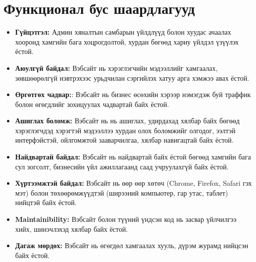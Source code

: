 \section{Функционал бус шаардлагууд}
\begin{itemize}
	\item \textbf{Гүйцэтгэл:} Админ хяналтын самбарын үйлдлүүд болон хуудас ачаалах хооронд хамгийн бага хоцрогдолтой, хурдан бөгөөд хариу үйлдэл үзүүлэх ёстой.

	\item \textbf{Аюулгүй байдал:} Вэбсайт нь хэрэглэгчийн мэдээллийг хамгаалах, зөвшөөрөлгүй нэвтрэхээс урьдчилан сэргийлэх хатуу арга хэмжээ авах ёстой.

	\item \textbf{Өргөтгөх чадвар:}: Вэбсайт нь бизнес өсөхийн хэрээр нэмэгдэж буй траффик болон өгөгдлийг зохицуулах чадвартай байх ёстой.

	\item \textbf{Ашиглах боломж:} Вэбсайт нь  нь ашиглах, удирдахад хялбар байх бөгөөд хэрэглэгчдэд хэрэгтэй мэдээллээ хурдан олох боломжийг олгодог, ээлтэй интерфэйстэй, ойлгомжтой зааварчилгаа, хялбар навигацтай байх ёстой.

	\item \textbf{Найдвартай байдал:} Вэбсайт нь найдвартай байх ёстой бөгөөд хамгийн бага сул зогсолт, бизнесийн үйл ажиллагаанд саад учруулахгүй байх ёстой.

	\item \textbf{Хүртээмжтэй байдал:} Вэбсайт нь өөр өөр хөтөч (Chrome, Firefox, Safari гэх мэт) болон төхөөрөмжүүдтэй (ширээний компьютер, гар утас, таблет) нийцтэй байх ёстой.

	\item \textbf{Maintainibility:} Вэбсайт болон түүний үндсэн код нь засвар үйлчилгээ хийх, шинэчлэхэд хялбар байх ёстой.

	\item \textbf{Дагаж мөрдөх:} Вэбсайт нь өгөгдөл хамгаалах хууль, дүрэм журамд нийцсэн байх ёстой.
\end{itemize}

